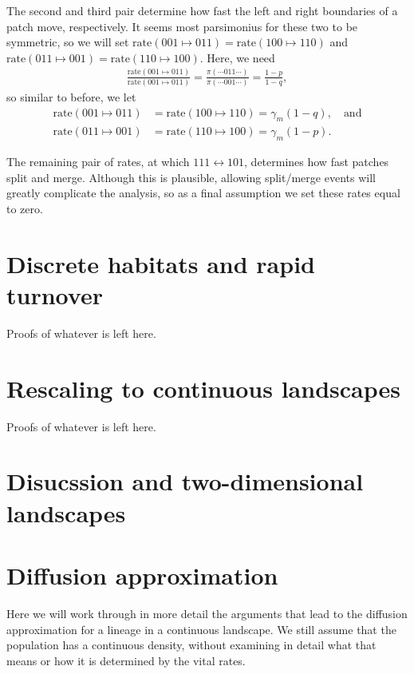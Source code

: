 \documentclass{article}
\newcommand{\rate}[2]{\text{rate}(#1\mapsto#2)}
\begin{document}
The second and third pair determine how fast the left and right boundaries of a patch move, respectively.
It seems most parsimonius for these two to be symmetric,
so we will set $\rate{001}{011} = \rate{100}{110}$ and $\rate{011}{001} = \rate{110}{100}$.
Here, we need
\begin{align*}
    \frac{\rate{001}{011}}{\rate{001}{011}}
    =
    \frac{\pi(\cdots011\cdots)}{\pi(\cdots001\cdots)}
    =
    \frac{1-p}{1-q} ,
\end{align*}
so similar to before, we let
\begin{align}
    \rate{001}{011} &= \rate{100}{110} = \gamma_m (1-q), \quad \text{and} \\
    \rate{011}{001} &= \rate{110}{100} = \gamma_m (1-p) .
\end{align}

The remaining pair of rates, at which $111 \leftrightarrow 101$,
determines how fast patches split and merge.
Although this is plausible, allowing split/merge events will greatly complicate the analysis,
so as a final assumption we set these rates equal to zero.




\section{Discrete habitats and rapid turnover}

Proofs of whatever is left here.


\section{Rescaling to continuous landscapes}

Proofs of whatever is left here.


\section{Disucssion and two-dimensional landscapes}



\appendix


\section{Diffusion approximation}

Here we will work through in more detail the arguments that lead to the diffusion approximation
for a lineage in a continuous landscape.
We still assume that the population has a continuous density,
without examining in detail what that means or how it is determined by the vital rates.
\end{document}
